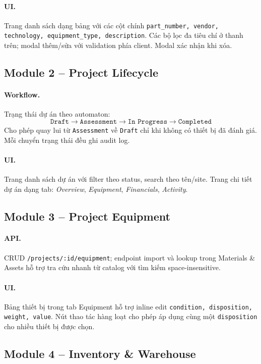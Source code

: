 \paragraph{UI.} Trang danh sách dạng bảng với các cột chính \texttt{part\_number, vendor, technology, equipment\_type, description}. Các bộ lọc đa tiêu chí ở thanh trên; modal thêm/sửa với validation phía client. Modal xác nhận khi xóa.

\subsection{Module 2 -- Project Lifecycle}
\paragraph{Workflow.} Trạng thái dự án theo automaton:
\[
    \texttt{Draft} \rightarrow \texttt{Assessment} \rightarrow \texttt{In Progress} \rightarrow \texttt{Completed}
\]
Cho phép quay lui từ \texttt{Assessment} về \texttt{Draft} chỉ khi không có thiết bị đã đánh giá. Mỗi chuyển trạng thái đều ghi audit log.

\paragraph{UI.} Trang danh sách dự án với filter theo status, search theo tên/site. Trang chi tiết dự án dạng tab: \emph{Overview}, \emph{Equipment}, \emph{Financials}, \emph{Activity}.

\subsection{Module 3 -- Project Equipment}
\paragraph{API.} CRUD \texttt{/projects/:id/equipment}; endpoint import và lookup trong Materials \& Assets hỗ trợ tra cứu nhanh từ catalog với tìm kiếm space-insensitive.

\paragraph{UI.} Bảng thiết bị trong tab Equipment hỗ trợ inline edit \texttt{condition, disposition, weight, value}. Nút thao tác hàng loạt cho phép áp dụng cùng một \texttt{disposition} cho nhiều thiết bị được chọn.

\subsection{Module 4 -- Inventory \& Warehouse}
